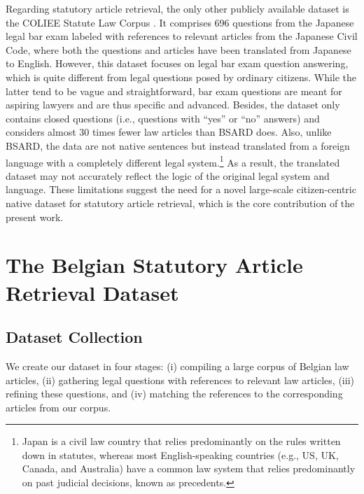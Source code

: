 \documentclass[11pt]{article}
\begin{document}
Regarding statutory article retrieval, the only other publicly available dataset is the COLIEE Statute Law Corpus \citep{rabelo2020coliee}. It comprises 696 questions from the Japanese legal bar exam labeled with references to relevant articles from the Japanese Civil Code, where both the questions and articles have been translated from Japanese to English. However, this dataset focuses on legal bar exam question answering, which is quite different from legal questions posed by ordinary citizens. While the latter tend to be vague and straightforward, bar exam questions are meant for aspiring lawyers and are thus specific and advanced. Besides, the dataset only contains closed questions (i.e., questions with “yes” or “no” answers) and considers almost 30 times fewer law articles than BSARD does. Also, unlike BSARD, the data are not native sentences but instead translated from a foreign language with a completely different legal system.\footnote{Japan is a civil law country that relies predominantly on the rules written down in statutes, whereas most English-speaking countries (e.g., US, UK, Canada, and Australia) have a common law system that relies predominantly on past judicial decisions, known as precedents.} As a result, the translated dataset may not accurately reflect the logic of the original legal system and language. These limitations suggest the need for a novel large-scale citizen-centric native dataset for statutory article retrieval, which is the core contribution of the present work.

\section{The Belgian Statutory Article Retrieval Dataset \label{sec:dataset}}

\subsection{Dataset Collection \label{subsec:dataset-collection}}
We create our dataset in four stages: (i) compiling a large corpus of Belgian law articles, (ii) gathering legal questions with references to relevant law articles, (iii) refining these questions, and (iv) matching the references to the corresponding articles from our corpus.
\end{document}
